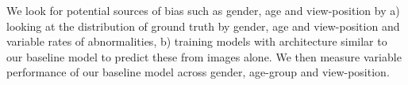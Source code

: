 \documentclass[12pt,oneside,a4paper]{report}
\begin{document}

We look for potential sources of bias such as gender, age and view-position
by a) looking at the distribution of ground truth by gender, age and view-position and variable rates of abnormalities, b) training models with architecture similar to our baseline model to predict these from images alone. We then measure variable performance of our baseline model across gender, age-group and view-position.
\end{document}
